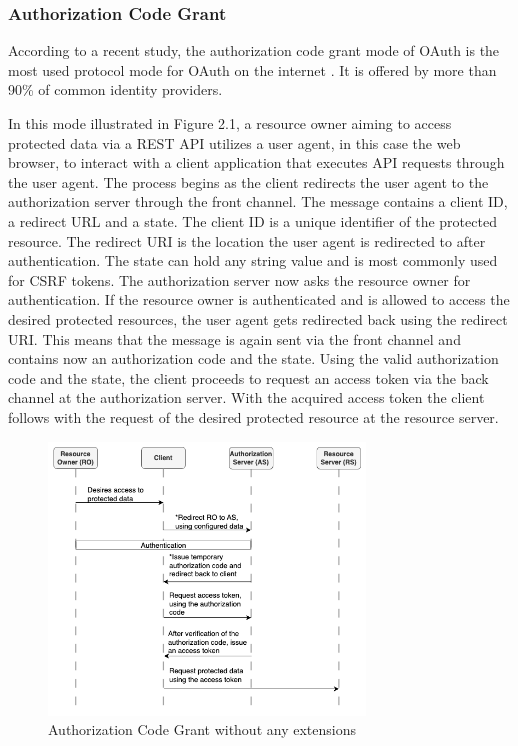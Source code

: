 \documentclass[
    fontsize=12pt,
    headings=small,
    parskip=half,           %
    bibliography=totoc,
    numbers=noenddot,       %
    open=any,               %
    ]{scrreprt}
\begin{document}
\subsubsection{Authorization Code Grant}
According to a recent study, the authorization code grant mode of OAuth is the
most used protocol mode for OAuth on the internet
\cite[Table1]{philippaerts2022oauch}. It is offered by more than 90\% of common 
identity providers.

In this mode illustrated in Figure 2.1, a resource owner aiming to access
protected data via a REST API utilizes a user agent, in this case the web
browser, to interact with a client application that executes API requests
through the user agent. The process begins as the client redirects the user
agent to the authorization server through the front channel. The message
contains a client ID, a redirect URL and a state. The client ID is a unique
identifier of the protected resource. The redirect URI is the location the user
agent is redirected to after authentication. The state can hold any string
value and is most commonly used for CSRF tokens. The authorization server now
asks the resource owner for authentication. If the resource owner is
authenticated and is allowed to access the desired protected resources, the
user agent gets redirected back using the redirect URI. This means that the
message is again sent via the front channel and contains now an authorization
code and the state. Using the valid authorization code and the state, the
client proceeds to request an access token via the back channel at the
authorization server. With the acquired access token the client follows with
the request of the desired protected resource at the resource server.

\begin{figure}[ht]
	\sffamily\footnotesize
	\includegraphics[width=0.75\textwidth]{pic/authorization_code_grant.png}
	\unitlength=0.75mm
	\linethickness{0.4pt}
	\caption{Authorization Code Grant without any extensions}
	\label{fig:auth_code_grant}
\end{figure}
\end{document}
